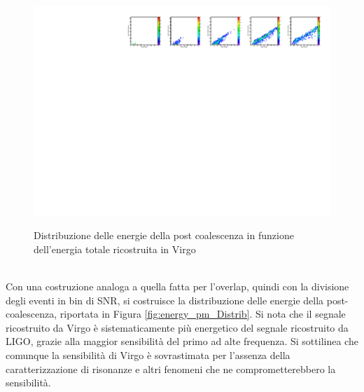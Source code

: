 \begin{figure}[ht]
	{\includegraphics[width=1.\textwidth]{figures/Capitolo_4/report/EnergyDistributionFactorDetector3APR4_q09.pdf}}
	\caption{Distribuzione delle energie della post coalescenza in funzione dell'energia totale ricostruita in Virgo}
	\label{fig:energy_pm_colz}
\end{figure}\\
Con una costruzione analoga a quella fatta per l'overlap, quindi con la divisione degli eventi in bin di SNR, si costruisce la distribuzione delle energie della post-coalescenza, riportata in Figura \ref{fig:energy_pm_Distrib}. Si nota che il segnale ricostruito da Virgo è sistematicamente più energetico del segnale ricostruito da LIGO, grazie alla maggior sensibilità del primo ad alte frequenza. Si sottilinea che comunque la sensibilità di Virgo è sovrastimata per l'assenza della caratterizzazione di risonanze e altri fenomeni che ne comprometterebbero la sensibilità.
